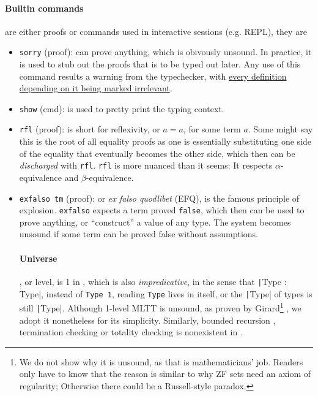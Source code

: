\documentclass[a4paper, 11pt]{article}
\theoremstyle{remark}\newtheorem*{remark}{Remark}
\theoremstyle{definition}\newtheorem*{definition}{Definition}
\begin{document}
\paragraph{Builtin commands} are either proofs or commands used in interactive sessions (e.g. REPL), they are
\begin{itemize}\itemsep0em
\item \texttt{sorry} (proof): can prove anything, which is obivously unsound. In practice, it is used
to stub out the proofs that is to be typed out later. Any use of this command results a warning
from the typechecker, with \underline{every definition depending on it being marked irrelevant}.
\item \texttt{show} (cmd): is used to pretty print the typing context.
\item \texttt{rfl}  (proof): is short for reflexivity, or $a = a$, for some term $a$. Some might say this is the root of all
equality proofs as one is essentially substituting one side
of the equality
that eventually becomes the other side, which then can be \emph{discharged} with \texttt{rfl}. \texttt{rfl} is more nuanced than
it seems: It respects $\alpha$-equivalence and
$\beta$-equivalence.
\item \texttt{exfalso tm} (proof): or \emph{ex falso quodlibet} (EFQ), is the famous principle of explosion.
\texttt{exfalso} expects a term proved \texttt{false}, which then can be used
to prove anything, or ``construct'' a value of any type.
The system becomes unsound if some term can be proved false without assumptions.

\paragraph{Universe}, or level, is 1 in \Tigrisd,
which is also \emph{impredicative}, in the sense that
\texttt|Type : Type|, instead of \texttt{Type 1}, reading \texttt{Type} lives in itself, or
the \texttt|Type| of types is still \texttt|Type|.
Although 1-level MLTT is unsound, as proven by Girard\footnote{
We do not show why it is unsound, as that is mathematicians' job.
Readers only have to know that the reason is similar
to why ZF sets need an axiom of regularity; Otherwise there
could be a Russell-style paradox.
} , we adopt
it nonetheless for its simplicity. Similarly, bounded recursion
, termination checking or totality checking is nonexistent in \Tigrisd.

\end{itemize}
\end{document}
